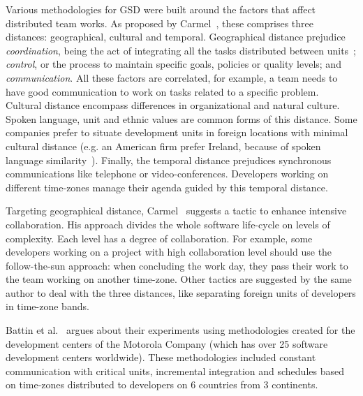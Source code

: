 \documentclass[letterpaper]{article}
\begin{document}
Various methodologies for GSD were built around the factors that affect
distributed team works. As proposed by Carmel~\cite{carmel1999}, these comprises
three distances: geographical, cultural and temporal. Geographical distance
prejudice \emph{coordination}, being the act of integrating all the tasks
distributed between units~\cite{carmel2001}; \emph{control}, or the process to
maintain specific goals, policies or quality levels; and
\emph{communication}. All these factors are correlated, for example, a team needs
to have good communication to work on tasks related to a specific problem. Cultural
distance encompass differences in organizational and natural culture. Spoken
language, unit and ethnic values are common forms of this distance. Some
companies prefer to situate development units in foreign locations with minimal
cultural distance (e.g. an American firm prefer Ireland, because of spoken
language similarity~\cite{carmel2001}). Finally, the temporal distance
prejudices synchronous communications like telephone or video-conferences.
Developers working on different time-zones manage
their agenda guided by this temporal distance.

Targeting geographical distance, Carmel~\cite{carmel2001} suggests a tactic to
enhance intensive collaboration. His approach divides the whole software
life-cycle on levels of complexity. Each level has a degree of
collaboration. For example, some developers working on a project with high
collaboration level should use the follow-the-sun approach: when concluding the
work day, they pass their work to the team working on another time-zone. Other
tactics are suggested by the same author to deal with the three distances, like
separating foreign units of developers in time-zone bands.

Battin et al.~\cite{battin2001} argues about their experiments using
methodologies created for the development centers of the
Motorola Company (which has over 25 software development centers
worldwide). These methodologies included constant communication with critical
units, incremental integration and schedules based on time-zones distributed to
developers on 6 countries from 3 continents.
\end{document}
